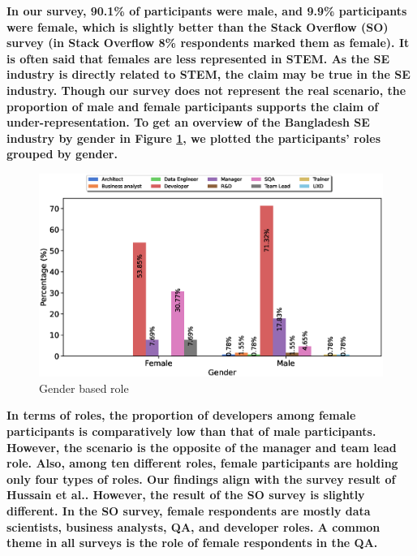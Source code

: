 \label{analysis by gender}

\bf{In our survey, 90.1\% of participants were male, and 9.9\% participants were
female, which is slightly better than the Stack Overflow (SO) survey
\citep{StackoverflowSurvey2017,StackoverflowSurvey2018,StackoverflowSurvey2019,StackoverflowSurvey2020}
(in Stack Overflow 8\% respondents marked them as female).} It is often said that
females are less represented in STEM. As the SE industry is directly related to
STEM, the claim may be true in the SE industry. Though our survey does not
represent the real scenario, the proportion of male and female participants
supports the claim of under-representation. To get an overview of the Bangladesh
SE industry by gender in Figure \ref{fig:gender and role}, we plotted the
participants' roles grouped by gender.
\begin{figure}[h] \centering
 \includegraphics[scale=0.3]{Figures/Gender_and_Role}
 \caption{Gender based role}
 \label{fig:gender and role}
\end{figure}
\bf{In terms of roles, the proportion of developers among female participants is
comparatively low than that of male participants. However, the scenario is the
opposite of the manager and team lead role.} \bf{Also, among ten different roles, female participants are holding only four types of roles. Our findings align with the survey result of Hussain et
al.\citep{Hussain2020}. However,  the result of the SO survey\citep{StackoverflowSurvey2020} is slightly different. In the SO survey, female respondents are mostly data scientists, business analysts, QA, and developer roles. A common theme in all surveys is the role of female
respondents in the QA.}

